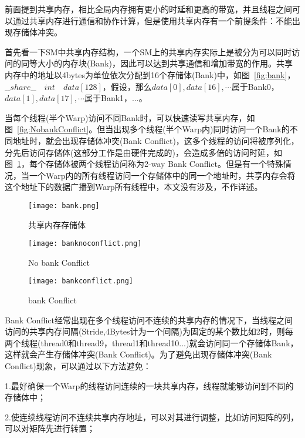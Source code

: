 前面提到共享内存，相比全局内存拥有更小的时延和更高的带宽，并且线程之间可以通过共享内存进行通信和协作计算，但是使用共享内存有一个前提条件：不能出现存储体冲突。

首先看一下SM中共享内存结构，一个SM上的共享内存实际上是被分为可以同时访问的同等大小的内存块(Bank)，因此可以达到共享通信和增加带宽的作用。共享内存中的地址以4bytes为单位依次分配到16个存储体(Bank)中，如图~\ref{fig:bank}，$\_\_share\_\_\quad int\quad data[128]$，假设，那么$data[0],data[16],\cdots$属于Bank0，$data[1],data[17],\cdots$属于Bank1，...。

当每个线程(半个Warp)访问不同Bank时，可以快速读写共享内存，如图~\ref{fig:NobankConflict}。但当出现多个线程(半个Warp内)同时访问一个Bank的不同地址时，就会出现存储体冲突(Bank Conflict)，这多个线程的访问将被序列化，分先后访问存储体(这部分工作是由硬件完成的)，会造成多倍的访问时延，如图~\ref{fig:bankConflict}，每个存储体被两个线程访问称为2-way Bank Conflict。但是有一个特殊情况，当一个Warp内的所有线程访问一个存储体中的同一个地址时，共享内存会将这个地址下的数据广播到Warp所有线程中，本文没有涉及，不作详述。

\begin{figure}
	\begin{minipage}{0.3\textwidth}
		\centering
		\texttt{[image: bank.png]}
		\caption{共享内存存储体}
		\label{fig:bank}
	\end{minipage}
	\hfill
	\begin{minipage}{0.30\textwidth}
		\centering
		\texttt{[image: banknoconflict.png]}
		\caption{No bank Conflict}
		\label{fig:NobankConflict}
	\end{minipage}
	\hfill
	\begin{minipage}{0.30\textwidth}
		\centering
		\texttt{[image: bankconflict.png]}
		\caption{bank Conflict}
		\label{fig:bankConflict}
	\end{minipage}
\end{figure}

Bank Conflict经常出现在多个线程访问不连续的共享内存的情况下，当线程之间访问的共享内存间隔(Stride,4Bytes计为一个间隔)为固定的某个数比如2时，则每两个线程(thread0和thread9，thread1和thread10...)就会访问同一个存储体Bank，这样就会产生存储体冲突(Bank Conflict)。为了避免出现存储体冲突(Bank Conflict)现象，可以通过以下方法避免：

1.最好确保一个Warp的线程访问连续的一块共享内存，线程就能够访问到不同的存储体中；

2.使连续线程访问不连续共享内存地址，可以对其进行调整，比如访问矩阵的列，可以对矩阵先进行转置；

